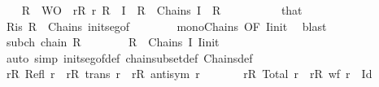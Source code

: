 \begin{isabellebody}
%
\isanewline
\ \ \isamarkupfalse%
\ {\isachardoublequoteopen}{\isasymUnion}R\ {\isasymin}\ {\isacharquery}{\kern0pt}WO\ {\isasymand}\ {\isacharparenleft}{\kern0pt}{\isasymforall}r{\isasymin}R{\isachardot}{\kern0pt}\ {\isacharparenleft}{\kern0pt}r{\isacharcomma}{\kern0pt}\ {\isasymUnion}R{\isacharparenright}{\kern0pt}\ {\isasymin}\ I{\isacharparenright}{\kern0pt}{\isachardoublequoteclose}\ \ {\isachardoublequoteopen}R\ {\isasymin}\ Chains\ I{\isachardoublequoteclose}\ \ R\isanewline
\ \ \isamarkupfalse%
\ {\isacharminus}{\kern0pt}\isanewline
\ \ \ \ \isamarkupfalse%
\ that\ \isamarkupfalse%
\ Ris{\isacharcolon}{\kern0pt}\ {\isachardoublequoteopen}R\ {\isasymin}\ Chains\ init{\isacharunderscore}{\kern0pt}seg{\isacharunderscore}{\kern0pt}of{\isachardoublequoteclose}\isanewline
\ \ \ \ \ \ \isamarkupfalse%
\ mono{\isacharunderscore}{\kern0pt}Chains\ {\isacharbrackleft}{\kern0pt}OF\ I{\isacharunderscore}{\kern0pt}init{\isacharbrackright}{\kern0pt}\ \isamarkupfalse%
\ blast\isanewline
\ \ \ \ \isamarkupfalse%
\ subch{\isacharcolon}{\kern0pt}\ {\isachardoublequoteopen}chain\isactrlsub {\isasymsubseteq}\ R{\isachardoublequoteclose}\isanewline
\ \ \ \ \ \ \isamarkupfalse%
\ {\isacartoucheopen}R\ {\isasymin}\ Chains\ I{\isacartoucheclose}\ I{\isacharunderscore}{\kern0pt}init\ \isamarkupfalse%
\ {\isacharparenleft}{\kern0pt}auto\ simp{\isacharcolon}{\kern0pt}\ init{\isacharunderscore}{\kern0pt}seg{\isacharunderscore}{\kern0pt}of{\isacharunderscore}{\kern0pt}def\ chain{\isacharunderscore}{\kern0pt}subset{\isacharunderscore}{\kern0pt}def\ Chains{\isacharunderscore}{\kern0pt}def{\isacharparenright}{\kern0pt}\isanewline
\ \ \ \ \isamarkupfalse%
\ {\isachardoublequoteopen}{\isasymforall}r{\isasymin}R{\isachardot}{\kern0pt}\ Refl\ r{\isachardoublequoteclose}\ \ {\isachardoublequoteopen}{\isasymforall}r{\isasymin}R{\isachardot}{\kern0pt}\ trans\ r{\isachardoublequoteclose}\ \ {\isachardoublequoteopen}{\isasymforall}r{\isasymin}R{\isachardot}{\kern0pt}\ antisym\ r{\isachardoublequoteclose}\isanewline
\ \ \ \ \ \ \ {\isachardoublequoteopen}{\isasymforall}r{\isasymin}R{\isachardot}{\kern0pt}\ Total\ r{\isachardoublequoteclose}\ \ {\isachardoublequoteopen}{\isasymforall}r{\isasymin}R{\isachardot}{\kern0pt}\ wf\ {\isacharparenleft}{\kern0pt}r\ {\isacharminus}{\kern0pt}\ Id{\isacharparenright}{\kern0pt}{\isachardoublequoteclose}\isanewline

\end{isabellebody}
